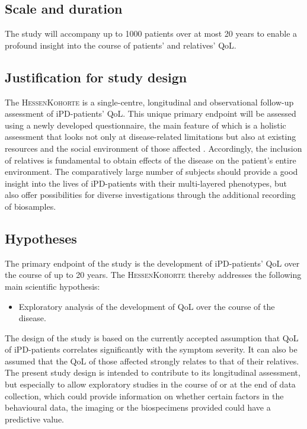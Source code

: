 \subsection{Scale and duration}
The study will accompany up to \num[round-precision = 0, round-mode = places]{1000}{} patients over at most 20 years to enable a profound insight into the course of patients' and relatives' \ac{QoL}.

\subsection{Justification for study design}
The \textsc{HessenKohorte} is a single-centre, longitudinal and observational follow-up assessment of \ac{iPD}-patients' \ac{QoL}. This unique primary endpoint will be assessed using a newly developed questionnaire, the main feature of which is a holistic assessment that looks not only at disease-related limitations but also at existing resources and the social environment of those affected \cite{thieken2022jpd}. Accordingly, the inclusion of relatives is fundamental to obtain effects of the disease on the patient's entire environment. The comparatively large number of subjects should provide a good insight into the lives of \ac{iPD}-patients with their multi-layered phenotypes, but also offer possibilities for diverse investigations through the additional recording of biosamples.

\subsection{Hypotheses}
\label{sec:hypoTheses}
The primary endpoint of the study is the development of \ac{iPD}-patients' \ac{QoL} over the course of up to 20 years. The \textsc{HessenKohorte} thereby addresses the following main scientific hypothesis:
\begin{itemize}
  \item Exploratory analysis of the development of \acl{QoL} over the course of the disease.
\end{itemize}
The design of the study is based on the currently accepted assumption that \ac{QoL} of \ac{iPD}-patients correlates significantly with the symptom severity. It can also be assumed that the \ac{QoL} of those affected strongly relates to that of their relatives. The present study design is intended to contribute to its longitudinal assessment, but especially to allow exploratory studies in the course of or at the end of data collection, which could provide information on whether certain factors in the behavioural data, the imaging or the biospecimens provided could have a predictive value.

